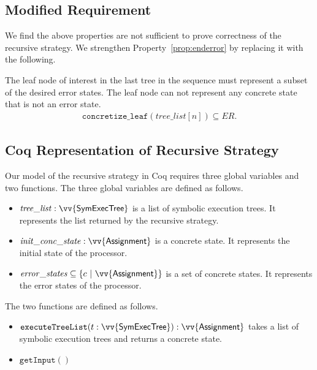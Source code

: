 \subsection{Modified Requirement}
We find the above properties are not sufficient to prove correctness of the
recursive strategy. We strengthen Property~\ref{prop:enderror} by replacing it with the following.

\setcounter{property}{1}
\renewcommand{\theproperty}{Z.\arabic{property}'} 
\begin{property}
  The leaf node of interest in the last tree in the
  sequence must represent a subset of the desired error states. The leaf node
  can not represent any concrete state that is not an error state.
  \label{prop:correctedz2}
  \begin{align*}
    \mathtt{concretize\_leaf}(\mathit{tree\_list}[n]) \subseteq \mathit{ER}.
  \end{align*}

 \end{property}
 
 
\subsection{Coq Representation of Recursive Strategy}
Our model of the recursive strategy in Coq requires three global variables
and two functions. The three global variables are defined as follows.

\begin{itemize}
\item $\mathit{tree\_list} : \vv{\textsf{SymExecTree}}$ is a list of symbolic
  execution trees. It represents the list returned by the recursive strategy.
\item $\mathit{init\_conc\_state} : \vv{\textsf{Assignment}}$ is a concrete
  state. It represents the initial state of the processor.
\item $\mathit{error\_states} \subseteq \{\concstate ~|~
  \vv{\textsf{Assignment}}\}$ is a set of concrete states. It represents the
  error states of the processor.
\end{itemize}

The two functions are defined as follows.
\begin{itemize}
\item $\mathtt{executeTreeList}(t : \vv{\textsf{SymExecTree}}) :
  \vv{\textsf{Assignment}}$ takes a list of symbolic execution trees and
  returns a concrete state.
\item $\mathtt{getInput}()$
\end{itemize}
  

